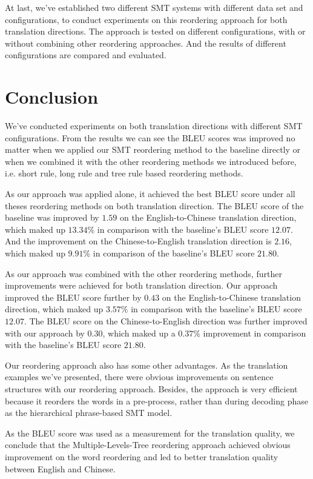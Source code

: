 At last, we've established two different SMT systems with different data set and configurations, to conduct experiments on this reordering approach for both translation directions. The approach is tested on different configurations, with or without combining other reordering approaches. And the results of different configurations are compared and evaluated.

\section{Conclusion}
\label{ch:Discussion:sec:Conclusion}

We've conducted experiments on both translation directions with different SMT configurations. From the results we can see the BLEU scores was improved no matter when we applied our SMT reordering method to the baseline directly or when we combined it with the other reordering methods we introduced before, i.e. short rule, long rule and tree rule based reordering methods.

As our approach was applied alone, it achieved the best BLEU score under all theses reordering methods on both translation direction. The BLEU score of the baseline was improved by $1.59$ on the English-to-Chinese translation direction, which maked up $13.34\%$ in comparison with the baseline's BLEU score $12.07$. And the improvement on the Chinese-to-English translation direction is $2.16$, which maked up $9.91\%$ in comparison of the baseline's BLEU score $21.80$.

As our approach was combined with the other reordering methods, further improvements were achieved for both translation direction. Our approach improved the BLEU score further by $0.43$ on the English-to-Chinese translation direction, which maked up $3.57\%$ in comparison with the baseline's BLEU score $12.07$. The BLEU score on the Chinese-to-English direction was further improved with our approach by $0.30$, which maked up a $0.37\%$ improvement in comparison with the baseline's BLEU score $21.80$.

Our reordering approach also has some other advantages. As the translation examples we've presented, there were obvious improvements on sentence structures with our reordering approach. Besides, the approach is very efficient because it reorders the words in a pre-process, rather than during decoding phase as the hierarchical phrase-based SMT model. 

As the BLEU score was used as a measurement for the translation quality, we conclude that the Multiple-Levels-Tree reordering approach achieved obvious improvement on the word reordering and led to better translation quality between English and Chinese.

